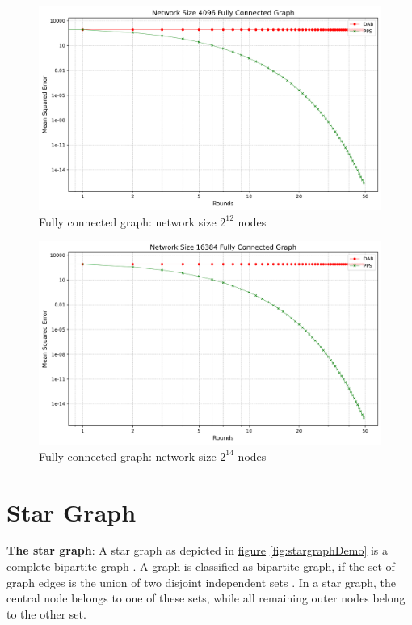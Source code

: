 \begin{figure}[H]
    \centering
    \includegraphics[scale=0.5]{figures/completeGraphSimulations/DAB_vs_PPS_FCG_r50_n4096.png}
    \caption{Fully connected graph: network size $2^{12}$ nodes}
    \label{fig:4096CompleteGraph}
\end{figure}
\begin{figure}[H]
    \centering
    \includegraphics[scale=0.5]{figures/completeGraphSimulations/DAB_vs_PPS_FCG_r50_n16384.png}
    \caption{Fully connected graph: network size $2^{14}$ nodes}
    \label{fig:16384CompleteGraph}
\end{figure}


\section{Star Graph}
\textbf{The star graph}: A star graph as depicted in \hyperref[fig:stargraphDemo]{figure} \ref{fig:stargraphDemo} is a complete bipartite graph \cite{west2001introduction}. A graph is classified as bipartite graph, if the set of graph edges is the union of two disjoint independent sets \cite{GraphTheorySchindelhaauer2021}. In a star graph, the central node belongs to one of these sets, while all remaining outer nodes belong to the other set.

